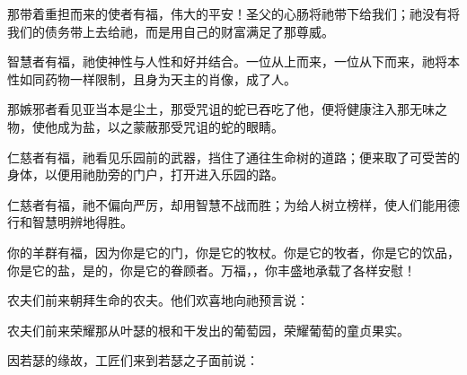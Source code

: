 那带着重担而来的使者有福，伟大的平安！圣父的心肠将祂带下给我们；祂没有将我们的债务带上去给祂，而是用自己的财富满足了那尊威。\par

智慧者有福，祂使神性与人性和好并结合。一位从上而来，一位从下而来，祂将本性如同药物一样限制，且身为天主的肖像，成了人。\par

那嫉邪者看见亚当本是尘土，那受咒诅的蛇已吞吃了他，便将健康注入那无味之物，使他成为盐，以之蒙蔽那受咒诅的蛇的眼睛。\par

仁慈者有福，祂看见乐园前的武器，挡住了通往生命树的道路；便来取了可受苦的身体，以便用祂肋旁的门户，打开进入乐园的路。\par

仁慈者有福，祂不偏向严厉，却用智慧不战而胜；为给人树立榜样，使人们能用德行和智慧明辨地得胜。\par

你的羊群有福，因为你是它的门，你是它的牧杖。你是它的牧者，你是它的饮品，你是它的盐，是的，你是它的眷顾者。万福，，你丰盛地承载了各样安慰！\par

农夫们前来朝拜生命的农夫。他们欢喜地向祂预言说：\par

农夫们前来荣耀那从叶瑟的根和干发出的葡萄园，荣耀葡萄的童贞果实。\par

\par

因若瑟的缘故，工匠们来到若瑟之子面前说：\par

\par

\par

